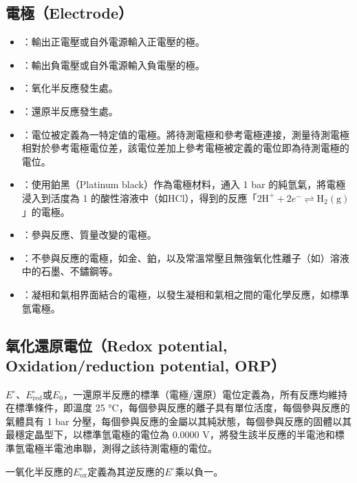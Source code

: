 \documentclass[a4paper,12pt]{article}
\begin{document}
\subsection{電極（Electrode）}
\begin{itemize}
\item {}：輸出正電壓或自外電源輸入正電壓的極。
\item {}：輸出負電壓或自外電源輸入負電壓的極。
\item {}：氧化半反應發生處。
\item {}：還原半反應發生處。
\item {}：電位被定義為一特定值的電極。將待測電極和參考電極連接，測量待測電極相對於參考電極電位差，該電位差加上參考電極被定義的電位即為待測電極的電位。
\item {}：使用鉑黑（Platinum black）作為電極材料，通入 1 bar 的純氫氣，將電極浸入到活度為 1 的酸性溶液中（如HCl），得到的反應「$\text{2H}^+ + 2e^- \rightleftharpoons \text{H}_2 (\text{g})$」的電極。
\item {}：參與反應、質量改變的電極。
\item {}：不參與反應的電極，如金、鉑，以及常溫常壓且無強氧化性離子（如）溶液中的石墨、不鏽鋼等。
\item {}：凝相和氣相界面結合的電極，以發生凝相和氣相之間的電化學反應，如標準氫電極。
\end{itemize}
\subsection{氧化還原電位（Redox potential, Oxidation/reduction potential, ORP）}
$E^{\circ}$、$E^{\circ}_{\text{red}}$或$E_0$，一還原半反應的標準（電極/還原）電位定義為，所有反應均維持在標準條件，即溫度 25 °C，每個參與反應的離子具有單位活度，每個參與反應的氣體具有 1 bar 分壓，每個參與反應的金屬以其純狀態，每個參與反應的固體以其最穩定晶型下，以標準氫電極的電位為 0.0000 V，將發生該半反應的半電池和標準氫電極半電池串聯，測得之該待測電極的電位。

一氧化半反應的$E^\circ_{\text{ox}}$定義為其逆反應的$E^\circ$乘以負一。
\end{document}
